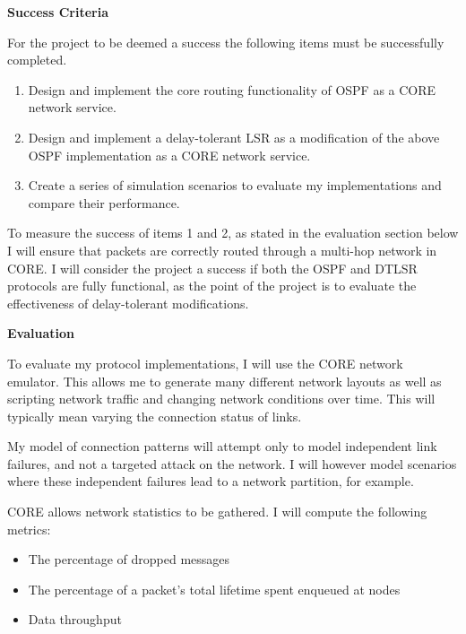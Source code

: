 \documentclass[withindex,glossary,openany]{cam-thesis}
\begin{document}
\vspace{8mm}
\LARGE\textbf{Success Criteria}\normalsize

For the project to be deemed a success the following items must be successfully completed.

\begin{enumerate}
\item
Design and implement the core routing functionality of OSPF as a CORE network service.

\item
Design and implement a delay-tolerant LSR as a modification of the above OSPF implementation as a CORE network service.

\item
Create a series of simulation scenarios to evaluate my implementations and compare their performance.
\end{enumerate}

To measure the success of items 1 and 2, as stated in the evaluation section below I will ensure that packets are correctly routed through a multi-hop network in CORE. I will consider the project a success if both the OSPF and DTLSR protocols are fully functional, as the point of the project is to evaluate the effectiveness of delay-tolerant modifications.

\vspace{8mm}
\LARGE\textbf{Evaluation}\normalsize

To evaluate my protocol implementations, I will use the CORE network emulator. This allows me to generate many different network layouts as well as scripting network traffic and changing network conditions over time. This will typically mean varying the connection status of links.

My model of connection patterns will attempt only to model independent link failures, and not a targeted attack on the network. I will however model scenarios where these independent failures lead to a network partition, for example.

CORE allows network statistics to be gathered. I will compute the following metrics:

\begin{itemize}
\item
The percentage of dropped messages

\item
The percentage of a packet’s total lifetime spent enqueued at nodes

\item
Data throughput
\end{itemize}
\end{document}
